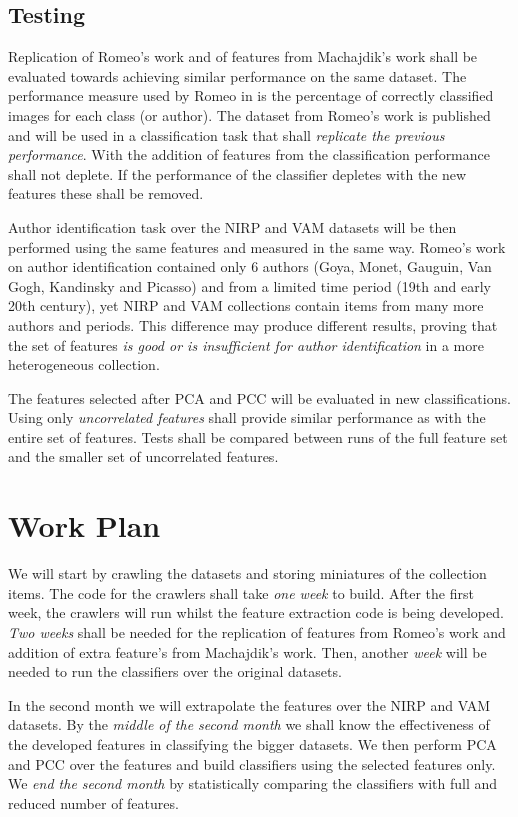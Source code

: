 \documentclass[a4paper,twocolumn]{article}
\begin{document}
\subsection{Testing}

Replication of Romeo's work and of features from Machajdik's work shall be
evaluated towards achieving similar performance on the same dataset.  The
performance measure used by Romeo in \cite{rmc12ajs} is the percentage of
correctly classified images for each class (or author).  The dataset from
Romeo's work is published and will be used in a classification task that shall
\emph{replicate the previous performance}.  With the addition of features from
\cite{mach10clas} the classification performance shall not deplete.  If the
performance of the classifier depletes with the new features these shall be
removed.

Author identification task over the NIRP and VAM datasets will be then
performed using the same features and measured in the same way.  Romeo's work
on author identification contained only 6 authors (Goya, Monet, Gauguin, Van
Gogh, Kandinsky and Picasso) and from a limited time period (19th and early
20th century), yet NIRP and VAM collections contain items from many more
authors and periods.  This difference may produce different results, proving
that the set of features \emph{is good or is insufficient for author
identification} in a more heterogeneous collection.

The features selected after PCA and PCC will be evaluated in new
classifications.  Using only \emph{uncorrelated features} shall provide similar
performance as with the entire set of features.  Tests shall be compared
between runs of the full feature set and the smaller set of uncorrelated
features.

\section{Work Plan}

We will start by crawling the datasets and storing miniatures of the collection
items.  The code for the crawlers shall take \emph{one week} to build.  After
the first week, the crawlers will run whilst the feature extraction code is
being developed.  \emph{Two weeks} shall be needed for the replication of
features from Romeo's work and addition of extra feature's from Machajdik's
work.  Then, another \emph{week} will be needed to run the classifiers over the
original datasets.

In the second month we will extrapolate the features over the NIRP and VAM
datasets.  By the \emph{middle of the second month} we shall know the
effectiveness of the developed features in classifying the bigger datasets.  We
then perform PCA and PCC over the features and build classifiers using the
selected features only.  We \emph{end the second month} by statistically
comparing the classifiers with full and reduced number of features.
\end{document}

